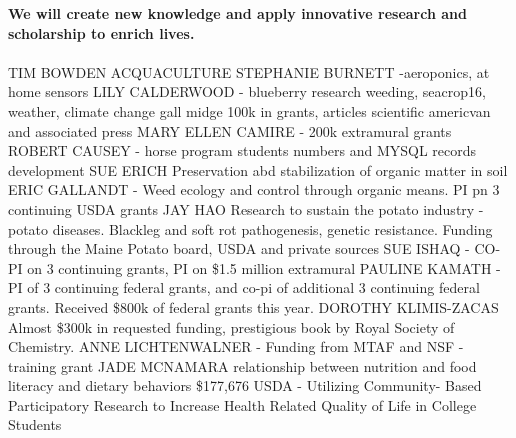 \documentclass[11pt]{article}
\begin{document}
\begin{description}[topsep=0pt, noitemsep]
\begin{description}[topsep=11pt, noitemsep]
\item[\textbf{1.2}] \textbf{We will create new knowledge and apply innovative research and scholarship to enrich lives.}\\~\\
TIM BOWDEN ACQUACULTURE
STEPHANIE BURNETT -aeroponics, at home sensors
LILY CALDERWOOD - blueberry research weeding, seacrop16, weather, climate change gall midge 100k in grants, articles scientific americvan and associated press 
MARY ELLEN CAMIRE - 200k extramural grants
ROBERT CAUSEY - horse program students numbers and MYSQL records development
SUE ERICH Preservation abd stabilization of organic matter in soil
ERIC GALLANDT - Weed ecology and control through organic means. PI pn 3 continuing USDA grants 
		JAY HAO Research to sustain the potato industry - potato diseases. Blackleg and soft rot pathogenesis, genetic resistance. Funding through the Maine Potato board, USDA and private sources  
SUE ISHAQ - CO-PI on 3 continuing grants, PI on \$1.5 million extramural 
PAULINE KAMATH - PI of 3 continuing federal grants, and co-pi of additional 3 continuing federal grants. Received \$800k of federal grants this year.
DOROTHY KLIMIS-ZACAS Almost \$300k in requested funding, prestigious book by Royal Society of Chemistry.
ANNE LICHTENWALNER - Funding from MTAF and NSF - training grant 
JADE MCNAMARA relationship between nutrition and food literacy and dietary behaviors \$177,676 USDA - Utilizing Community- Based Participatory Research to Increase Health Related Quality of Life in College Students


\end{description}
\end{description}
\end{document}
